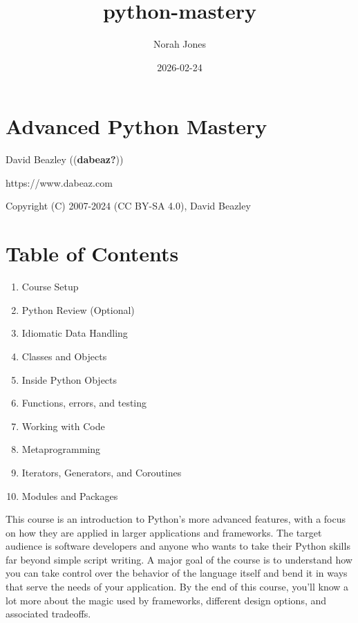 \documentclass[
  letterpaper,
  DIV=11,
  numbers=noendperiod]{scrreprt}
\title{python-mastery}
\author{Norah Jones}
\date{2026-02-24}
\providecommand{\tightlist}{%
  \setlength{\itemsep}{0pt}\setlength{\parskip}{0pt}}
\renewcommand*\contentsname{Table of contents}
\newcommand\contentsname{Table of contents}
\begin{document}
\maketitle

\renewcommand*\contentsname{Table of contents}
{
\hypersetup{linkcolor=}
\setcounter{tocdepth}{2}
\tableofcontents
}


\chapter{Advanced Python Mastery}\label{advanced-python-mastery}

David Beazley ((\textbf{dabeaz?}))

https://www.dabeaz.com

Copyright (C) 2007-2024 (CC BY-SA 4.0), David Beazley


\chapter{Table of Contents}\label{table-of-contents}

\begin{enumerate}
\def\labelenumi{\arabic{enumi}.}
\setcounter{enumi}{-1}
\tightlist
\item
  Course Setup\\
\item
  Python Review (Optional)\\
\item
  Idiomatic Data Handling\\
\item
  Classes and Objects\\
\item
  Inside Python Objects\\
\item
  Functions, errors, and testing\\
\item
  Working with Code\\
\item
  Metaprogramming\\
\item
  Iterators, Generators, and Coroutines\\
\item
  Modules and Packages
\end{enumerate}

This course is an introduction to Python's more advanced features, with
a focus on how they are applied in larger applications and frameworks.
The target audience is software developers and anyone who wants to take
their Python skills far beyond simple script writing. A major goal of
the course is to understand how you can take control over the behavior
of the language itself and bend it in ways that serve the needs of your
application. By the end of this course, you'll know a lot more about the
magic used by frameworks, different design options, and associated
tradeoffs.
\end{document}
